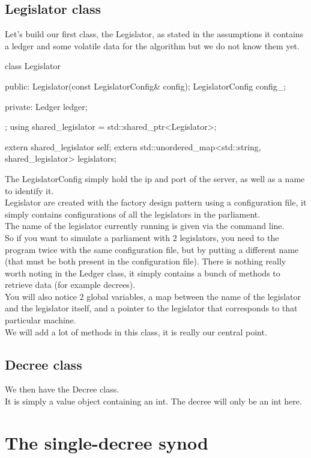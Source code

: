 \documentclass{article}
\begin{document}
\subsection{Legislator class}
Let's build our first class, the Legislator, as stated in the assumptions it contains a ledger and some volatile data for the algorithm but we do not know them yet.
\begin{code}
class Legislator
{
public:
    Legislator(const LegislatorConfig& config);
    LegislatorConfig config_;

private:
    Ledger ledger;
};
using shared_legislator = std::shared_ptr<Legislator>;

extern shared_legislator self;
extern std::unordered_map<std::string, shared_legislator> legislators;

\end{code}

The LegislatorConfig simply hold the ip and port of the server, as well as a name to identify it.\\
Legislator are created with the factory design pattern using a configuration file, it simply contains configurations of all the legislators in the parliament.\\
The name of the legislator currently running is given via the command line.\\
So if you want to simulate a parliament with 2 legislators, you need to the program twice with the same configuration file, but by putting a different name (that must be both present in the configuration file).
There is nothing really worth noting in the Ledger class, it simply contains a bunch of methods to retrieve data (for example decrees).\\
You will also notice 2 global variables, a map between the name of the legislator and the legislator itself, and a pointer to the legislator that corresponds to that particular machine.\\

We will add a lot of methods in this class, it is really our central point.

\subsection{Decree class}
We then have the Decree class.\\
It is simply a value object containing an int. The decree will only be an int here.

\pagebreak
\section{The single-decree synod}
\end{document}
